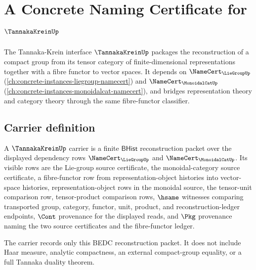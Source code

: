 \chapter{A Concrete Naming Certificate for $\TannakaKreinUp$}
\label{ch:concrete-instances-tannakakrein-namecert}

The Tannaka-Krein interface $\TannakaKreinUp$ packages the reconstruction of a compact group from its tensor category of finite-dimensional representations together with a fibre functor to vector spaces. It depends on $\NameCert_{\LieGroupUp}$ (\autoref{ch:concrete-instances-liegroup-namecert}) and $\NameCert_{\MonoidalCatUp}$ (\autoref{ch:concrete-instances-monoidalcat-namecert}), and bridges representation theory and category theory through the same fibre-functor classifier.

\section{Carrier definition}
\label{sec:tannakakrein-carrier}

\begin{definition}
\label{def:tannakakrein-fiber-functor-carrier}
A $\TannakaKreinUp$ carrier is a finite $\mathsf{BHist}$ reconstruction
packet over the displayed dependency rows
$\NameCert_{\LieGroupUp}$ and $\NameCert_{\MonoidalCatUp}$. Its visible rows
are the Lie-group source certificate, the monoidal-category source
certificate, a fibre-functor row from representation-object histories into
vector-space histories, representation-object rows in the monoidal source,
the tensor-unit comparison row, tensor-product comparison rows, $\hsame$
witnesses comparing transported group, category, functor, unit, product, and
reconstruction-ledger endpoints, $\Cont$ provenance for the displayed reads,
and $\Pkg$ provenance naming the two source certificates and the
fibre-functor ledger.

The carrier records only this BEDC reconstruction packet. It does not include
Haar measure, analytic compactness, an external compact-group equality, or a
full Tannaka duality theorem.
\end{definition}

